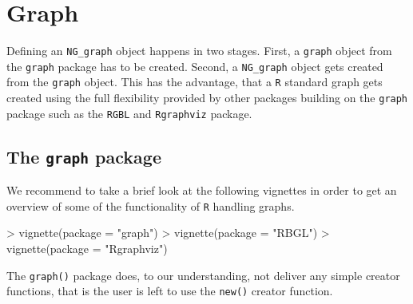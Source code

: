 \documentclass[12pt,oneside,titlepage,letter]{article}
\begin{document}
\section{Graph}
Defining an \texttt{NG\_graph} object happens in two stages. First, a \texttt{graph} object from the \texttt{graph} package has to be created. Second, a \texttt{NG\_graph} object gets created from the \texttt{graph} object. This has the advantage, that a \texttt{R} standard graph gets created using the full flexibility provided by other packages building on the \texttt{graph} package such as the \texttt{RGBL} and \texttt{Rgraphviz} package. 

\subsection{The \texttt{graph} package}
We recommend to take a brief look at the following vignettes in order to get an overview of some of the functionality of \texttt{R} handling graphs.

\begin{Schunk}
\begin{Sinput}
> vignette(package = "graph")
> vignette(package = "RBGL")
> vignette(package = "Rgraphviz")
\end{Sinput}
\end{Schunk}

The \texttt{graph()} package does, to our understanding, not deliver any simple creator functions, that is the user is left to use the \texttt{new()} creator function.
\end{document}
